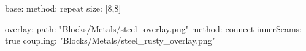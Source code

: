 base:
  method: repeat
  size: [8,8]
  
overlay:
  path: "Blocks/Metals/steel_overlay.png"
  method: connect
  innerSeams: true
  coupling: "Blocks/Metals/steel_rusty_overlay.png"